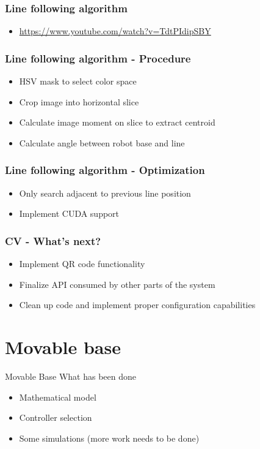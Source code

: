 \documentclass{beamer}
\begin{document}
\begin{frame}
    \frametitle{Line following algorithm}
    \begin{itemize}
	    \item \url{https://www.youtube.com/watch?v=TdtPIdipSBY}
    \end{itemize}
\end{frame}
\begin{frame}
    \frametitle{Line following algorithm - Procedure}
    \begin{itemize}
	    \item HSV mask to select color space
        \item Crop image into horizontal slice
        \item Calculate image moment on slice to extract centroid
        \item Calculate angle between robot base and line
    \end{itemize}
\end{frame}
\begin{frame}
    \frametitle{Line following algorithm - Optimization}
    \begin{itemize}
	    \item Only search adjacent to previous line position
        \item Implement CUDA support
    \end{itemize}
\end{frame}
\begin{frame}
    \frametitle{CV - What's next?}
    \begin{itemize}
	    \item Implement QR code functionality
        \item Finalize API consumed by other parts of the system
        \item Clean up code and implement proper configuration capabilities
    \end{itemize}
\end{frame}
\section{Movable base}
\begin{frame}{Movable Base}
    What has been done
    \begin{itemize}
        \item Mathematical model
        \item Controller selection
        \item Some simulations (more work needs to be done)
    \end{itemize}
 \end{frame}
\end{document}
